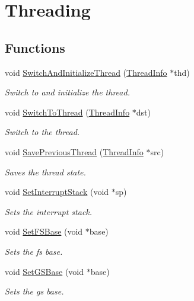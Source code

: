 \hypertarget{group__threading}{}\section{Threading}
\label{group__threading}
\subsection*{Functions}
\begin{DoxyCompactItemize}
\item 
void \hyperlink{group__threading_gae9ec18d8829a1a64a1e995f8d844c12e}{Switch\+And\+Initialize\+Thread} (\hyperlink{structThreadInfo}{Thread\+Info} $\ast$thd)
\begin{DoxyCompactList}\small\item\em Switch to and initialize the thread. \end{DoxyCompactList}\item 
void \hyperlink{group__threading_gab50249a047cce93800cd9b99182bc5c8}{Switch\+To\+Thread} (\hyperlink{structThreadInfo}{Thread\+Info} $\ast$dst)
\begin{DoxyCompactList}\small\item\em Switch to the thread. \end{DoxyCompactList}\item 
void \hyperlink{group__threading_gaf3847d3e9a254bed325a2b81049a58f7}{Save\+Previous\+Thread} (\hyperlink{structThreadInfo}{Thread\+Info} $\ast$src)
\begin{DoxyCompactList}\small\item\em Saves the thread state. \end{DoxyCompactList}\item 
void \hyperlink{group__threading_ga8a18e4dd59502903cf71e36d22dec9fe}{Set\+Interrupt\+Stack} (void $\ast$sp)
\begin{DoxyCompactList}\small\item\em Sets the interrupt stack. \end{DoxyCompactList}\item 
void \hyperlink{group__threading_ga951fba0f1b6959623b9992286f96503d}{Set\+F\+S\+Base} (void $\ast$base)
\begin{DoxyCompactList}\small\item\em Sets the fs base. \end{DoxyCompactList}\item 
void \hyperlink{group__threading_gae49b1e6e1278727134fc27fba13a08fc}{Set\+G\+S\+Base} (void $\ast$base)
\begin{DoxyCompactList}\small\item\em Sets the gs base. \end{DoxyCompactList}\item 

\end{DoxyCompactItemize}
